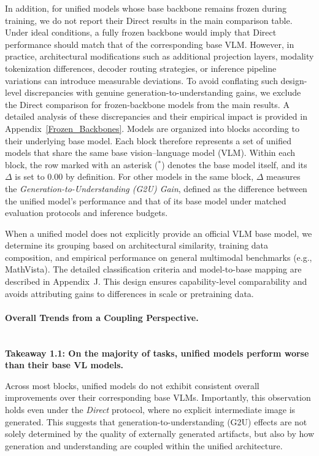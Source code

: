 \documentclass{article}
\theoremstyle{plain}
\theoremstyle{definition}
\theoremstyle{remark}
\begin{document}
In addition, for unified models whose base backbone remains frozen during training, we do not report their Direct results in the main comparison table.
Under ideal conditions, a fully frozen backbone would imply that Direct performance should match that of the corresponding base VLM.
However, in practice, architectural modifications such as additional projection layers, modality tokenization differences, decoder routing strategies, or inference pipeline variations can introduce measurable deviations.
To avoid conflating such design-level discrepancies with genuine generation-to-understanding gains, we exclude the Direct comparison for frozen-backbone models from the main results.
A detailed analysis of these discrepancies and their empirical impact is provided in Appendix~\ref{Frozen_Backbones}.
%
Models are organized into blocks according to their underlying base model.
Each block therefore represents a set of unified models that share the same base vision--language model (VLM).
Within each block, the row marked with an asterisk ($^*$) denotes the base model itself, and its $\Delta$ is set to $0.00$ by definition.
For other models in the same block, $\Delta$ measures the \emph{Generation-to-Understanding (G2U) Gain}, defined as the difference between the unified model's performance and that of its base model under matched evaluation protocols and inference budgets.

When a unified model does not explicitly provide an official VLM base model, we determine its grouping based on architectural similarity, training data composition, and empirical performance on general multimodal benchmarks (e.g., MathVista).
The detailed classification criteria and model-to-base mapping are described in Appendix~J.
This design ensures capability-level comparability and avoids attributing gains to differences in scale or pretraining data.

\paragraph{Overall Trends from a Coupling Perspective.}
~\\
\textbf{Takeaway 1.1: On the majority of tasks, unified models perform worse than their base VL models.}

Across most blocks, unified models do not exhibit consistent overall improvements over their corresponding base VLMs.
Importantly, this observation holds even under the \emph{Direct} protocol, where no explicit intermediate image is generated.
This suggests that generation-to-understanding (G2U) effects are not solely determined by the quality of externally generated artifacts, but also by how generation and understanding are coupled within the unified architecture.
\end{document}

